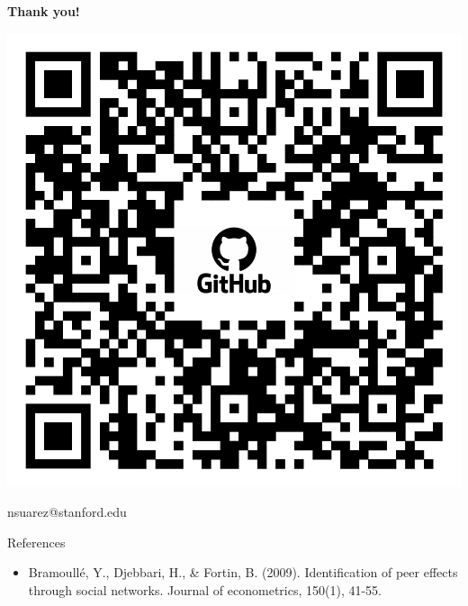 \documentclass[aspectratio=169]{beamer}
\begin{document}
\begin{frame}
  \begin{center}
  \Huge \textbf{Thank you!}
  \end{center}
\centering
\includegraphics[scale=0.14]{QR.png}
  \begin{center}
  nsuarez@stanford.edu
  \end{center}
\end{frame}



\appendix


\begin{frame}{References}
\begin{itemize}
\item Bramoullé, Y., Djebbari, H., \& Fortin, B. (2009). Identification of peer effects through social networks. Journal of econometrics, 150(1), 41-55.
\end{itemize}
\end{frame}
\end{document}
